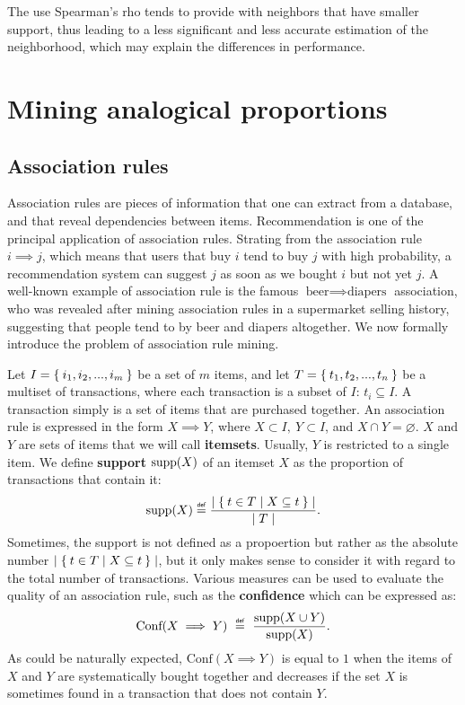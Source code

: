 The use Spearman's rho tends to provide with neighbors that have smaller
support, thus leading to a less significant and less accurate estimation of the
neighborhood, which may explain the differences in performance.

\section{Mining analogical proportions}

\subsection{Association rules}

Association rules are pieces of information that one can extract from a
database, and that reveal dependencies between items. Recommendation is one of
the principal application of association rules. Strating from the association
rule $i \implies j$, which means that users that buy $i$ tend to buy $j$ with
high probability, a recommendation system can suggest $j$ as soon as we bought
$i$ but not yet $j$. A well-known example of association rule is the famous
$\text{beer} \implies \text{diapers}$ association, who was revealed after
mining association rules in a supermarket selling history, suggesting that
people tend to by beer and diapers altogether. We now formally introduce the
problem of association rule mining.

Let $I = \Set{i_1, i_2, ..., i_m}$ be a set of $m$ items, and let $T =
\Set{t_1, t_2, ..., t_n}$ be a multiset of transactions, where each transaction
is a subset of $I$: $t_i \subseteq I$. A transaction simply is a set of items
that are purchased together. An association rule is expressed in the form $ X
\implies
Y$, where $ X \subset I, ~ Y \subset I$, and $X \cap Y = \varnothing$. $X$ and
$ Y $ are sets of items that we will call \textbf {itemsets}. Usually, $Y$ is
restricted to a single item. We define
\textbf{support} $\text{supp} (X) $ of an itemset $X$ as the proportion of
transactions that contain it:
$$\supp(X) \eqdef \frac{\mid \Set{t \in T | X \subseteq t}\mid}{\mid T \mid}.$$
Sometimes, the support is not defined as a propoertion but rather as the
absolute number $\mid \Set{t \in T | X \subseteq t}\mid$, but it only makes
sense to consider it with regard to the total number of transactions. Various
measures can be used to evaluate the quality of an association rule, such as
the \textbf{confidence } which can be expressed as:
$$\text{Conf}(X \implies Y)~\eqdef~\frac{\supp (X \cup Y)}{\supp (X)}.$$
As could be naturally expected, $\text{Conf}(X \implies Y)$ is equal to $1$
when the items of $X$ and $Y$ are systematically bought together and decreases
if the set $X$ is sometimes found in a transaction that does not contain $Y$.

